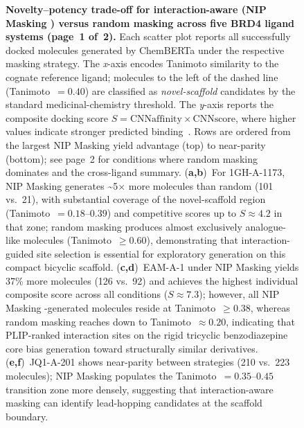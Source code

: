 \documentclass[a4paper,12pt]{article}
\begin{document}
\begin{figure}[p]
    \caption{%
        \textbf{Novelty--potency trade-off for interaction-aware (NIP Masking ) versus
        random masking across five BRD4 ligand systems (page~1 of~2).}
        Each scatter plot reports all successfully docked molecules generated
        by ChemBERTa under the respective masking strategy.
        The \textit{x}-axis encodes Tanimoto similarity to the cognate
        reference ligand; molecules to the left of the dashed line
        (Tanimoto~$= 0.40$) are classified as \emph{novel-scaffold}
        candidates by the standard medicinal-chemistry threshold.
        The \textit{y}-axis reports the composite docking score
        $S = \text{CNNaffinity} \times \text{CNNscore}$, where higher values
        indicate stronger predicted binding~\cite{ragoza2017protein}.
        Rows are ordered from the largest NIP Masking yield advantage (top) to
        near-parity (bottom); see page~2 for conditions where random masking
        dominates and the cross-ligand summary.
        (\textbf{a,b})~For 1GH-A-1173, NIP Masking generates \textasciitilde5$\times$
        more molecules than random (101 vs.\ 21), with substantial coverage
        of the novel-scaffold region (Tanimoto~$= 0.18$--$0.39$) and
        competitive scores up to $S \approx 4.2$ in that zone; random
        masking produces almost exclusively analogue-like molecules
        (Tanimoto~$\geq 0.60$), demonstrating that interaction-guided site
        selection is essential for exploratory generation on this compact
        bicyclic scaffold.
        (\textbf{c,d})~EAM-A-1 under NIP Masking yields 37\% more molecules (126
        vs.\ 92) and achieves the highest individual composite score across
        all conditions ($S \approx 7.3$); however, all NIP Masking -generated
        molecules reside at Tanimoto~$\geq 0.38$, whereas random masking
        reaches down to Tanimoto~$\approx 0.20$, indicating that PLIP-ranked
        interaction sites on the rigid tricyclic benzodiazepine core bias
        generation toward structurally similar derivatives.
        (\textbf{e,f})~JQ1-A-201 shows near-parity between strategies
        (210 vs.\ 223 molecules); NIP Masking populates the Tanimoto~$= 0.35$--$0.45$
        transition zone more densely, suggesting that interaction-aware
        masking can identify lead-hopping candidates at the scaffold
        boundary.
    }
    \label{fig:NIP Masking _vs_rand_docking}
\end{figure}
 
\end{document}
